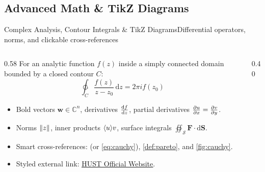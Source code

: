 \documentclass[aspectratio=43,10pt]{beamer}
\begin{document}
\subsection{Advanced Math \& TikZ Diagrams}
\begin{frame}{Complex Analysis, Contour Integrals \& TikZ Diagrams}{Differential operators, norms, and clickable cross-references}
  \small
  \begin{columns}[c]
    \begin{column}{0.58\textwidth}
      For an analytic function $f(z)$ inside a simply connected domain bounded by a closed contour $C$:
      \begin{equation}
        \ointctrclockwise_{C} \frac{f(z)}{z - z_0}\,\mathrm{d}z = 2\pi i f(z_0) \label{eq:cauchy}
      \end{equation}
      \begin{itemize}\setlength{\itemsep}{2pt}
        \item Bold vectors $\bm{w} \in \mathbb{C}^n$, derivatives $\odv{f}{z}$, partial derivatives $\pdv{u}{x} = \pdv{v}{y}$.
        \item Norms $\lVert z\rVert$, inner products $\langle u\rangle{v}$, surface integrals $\oiint_{\mathcal{S}} \bm{F}\cdot\mathrm{d}\bm{S}$.
        \item Smart cross-references:  (or \eqref{eq:cauchy}), \cref{def:pareto}, and \cref{fig:cauchy}.
        \item Styled external link: \href{https://hust.edu.vn}{\underline{HUST Official Website}}.
      \end{itemize}
    \end{column}
    \begin{column}{0.40\textwidth}
      \centering
      \vskip 2pt
      \label{fig:cauchy}
    \end{column}
  \end{columns}
\end{frame}
\end{document}
